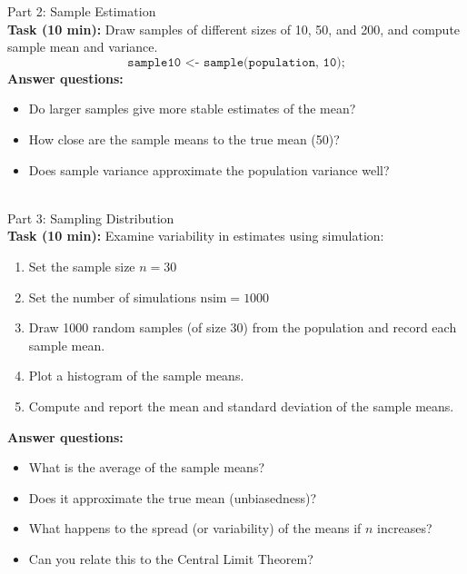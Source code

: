 \documentclass[main.tex]{subfiles}
\begin{document}
\begin{frame}
\begin{block}{Part 2: Sample Estimation\\}
\textbf{Task (10 min):} Draw samples of different sizes of 10, 50, and 200, and compute sample mean and variance.
 $$\texttt{sample10 <- sample(population, 10);}$$
\textbf{Answer questions:}
\begin{itemize}
  \item Do larger samples give more stable estimates of the mean?
  \item How close are the sample means to the true mean (50)?
  \item Does sample variance approximate the population variance well?
\end{itemize}
\end{block}
\end{frame}


\begin{frame}
\begin{block}{\\Part 3: Sampling Distribution\\}
\textbf{Task (10 min):} Examine variability in estimates using simulation:
\begin{enumerate}
\small
  \item Set the sample size $n=30$
  \item Set the number of simulations $\text{nsim} = 1000$
  \item Draw 1000 random samples (of size 30) from the population and record each sample mean.
  \item Plot a histogram of the sample means.
    \item Compute and report the mean and standard deviation of the sample means.
\end{enumerate}
\textbf{Answer questions:}
\begin{itemize}
\small
  \item What is the average of the sample means?
  \item Does it approximate the true mean (unbiasedness)?
  \item What happens to the spread (or variability) of the means if $n$ increases?
  \item Can you relate this to the Central Limit Theorem?
\end{itemize}
\end{block}
\end{frame}
\end{document}
